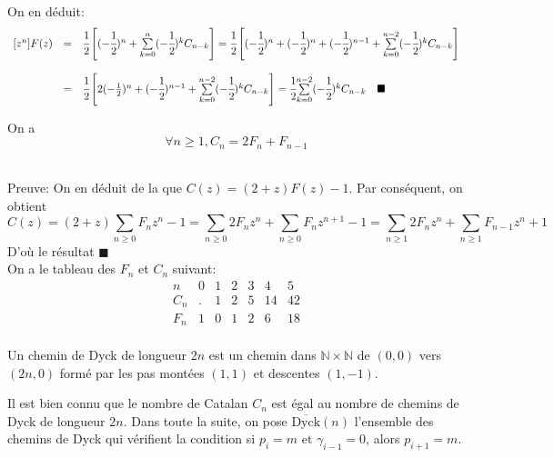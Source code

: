 \text{}\vspace{5pt}\\
On en déduit:
\[
	\begin{array}{c c l}
		[z^n]F(z) & =       & \cfrac{1}{2}\left[(-\cfrac{1}{2})^n + \underset{k=0}{\overset{n}{\sum}}(-\cfrac{1}{2})^k C_{n-k}
			\right]=\cfrac{1}{2}\left[(-\cfrac{1}{2})^n + (-\cfrac{1}{2})^n +(-\cfrac{1}{2})^{n-1} +\underset{k=0}
		{\overset{n-2}{\sum}}(-\cfrac{1}{2})^k C_{n-k}\right]                                                                    \\
		          & \text{} &                                                                                                    \\
		          & =       & \cfrac{1}{2}\left[2(-\frac{1}{2})^n + (-\cfrac{1}{2})^{n-1} +\underset{k=0}{\overset{n-2}{\sum}}(-
			\cfrac{1}{2})^k C_{n-k}\right]=\cfrac{1}{2}\underset{k=0}{\overset{n-2}{\sum}}(-\cfrac{1}{2})^k C_{n-k}
		\hspace{10pt}\blacksquare
	\end{array}
\]
\text{}\vspace{5pt}
\begin{proposition}\label{cnfn}
	On a \[\forall n\geq 1, C_{n}=2F_{n}+F_{n-1}\]
\end{proposition}
\text{}\\
Preuve:
On en déduit de la  que $C(z)=(2+z)F(z)-1$. Par conséquent, on obtient
\[C(z)= (2+z)\underset{n\geq0}{\sum}F_{n}z^n -1=\sum_{n\geq 0}2F_{n}z^n+\sum_{n\geq 0} F_{n}
	z^{n+1}-1=\sum_{n\geq 1}2F_{n}z^n+\sum_{n\geq 1} F_{n-1}z^{n}+1\]
D'où le résultat \hspace{5pt}$\blacksquare$ \vspace{5pt}\\
On a le tableau des $F_{n}$ et $C_{n}$ suivant:
$$
	\begin{matrix}
		n  & 0 & 1 & 2 & 3 & 4 & 5                 \\
		C_{n}  & . & 1 & 2 & 5 & 14 & 42             \\
		F_{n}  & 1 & 0 & 1 & 2 & 6 & 18         \\
	\end{matrix}
$$
\begin{definition}
	\begin{rm}
		Un chemin de Dyck de longueur $2n$ est un chemin dans $\mathbb{N}\times \mathbb{N}$ de $(0, 0)$ vers $(2n, 0)$ formé par les pas montées $(1,1)$
		et descentes $(1,-1)$.
	\end{rm}
\end{definition}
Il est bien connu que le nombre de Catalan $C_{n}$ est égal au nombre de chemins de Dyck
de longueur $2n$. Dans toute la suite, on pose $\overline{\text{Dyck}}(n)$ l'ensemble des chemins de Dyck qui
vérifient la condition si $p_{i}=m \text{ et } \gamma_{i-1}=0$, alors  $p_{i+1}=m$.

